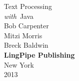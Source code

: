 \cleardoublepage
\pagestyle{empty}
\vspace*{1in}
\begin{center}
{\hfill \fontsize{45}{65}\selectfont Text Processing \\[18pt] \hfill {\fontsize{30}{45}\it with}\ Java}
\\[1in]
{\hfill\Huge Bob Carpenter}
\\[12pt]
{\hfill\Huge Mitzi Morris}
\\[12pt]
{\hfill\Huge Breck Baldwin}
\\[-1pt]
\vfill
{\hfill \large\bf LingPipe Publishing}
\\[1pt]
{\hfill \small New York}
\\[-1pt]
{\hfill \small 2013}
\end{center}
